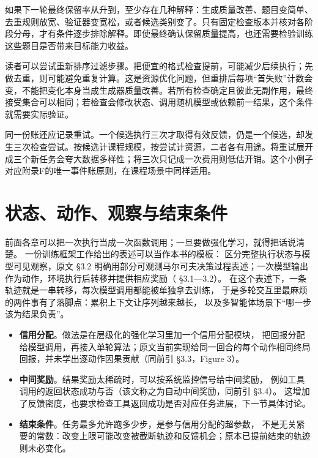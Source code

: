 如果下一轮最终保留率从升到，至少存在几种解释：生成质量改善、题目变简单、去重规则放宽、验证器变宽松，或者候选类别变了。只有固定检查版本并核对各阶段分母，才有条件逐步排除解释。即使最终确认保留质量提高，也还需要检验训练这些题目是否带来目标能力收益。

读者可以尝试重新排序过滤步骤。把便宜的格式检查提前，可能减少后续执行；先做去重，则可能避免重复计算。这是资源优化问题，但重排后每项“首失败”计数会变，不能把变化本身当成生成器质量改善。若所有检查确定且彼此无副作用，最终接受集合可以相同；若检查会修改状态、调用随机模型或依赖前一结果，这个条件就需要实际验证。

同一份账还应记录重试。一个候选执行三次才取得有效反馈，仍是一个候选，却发生三次检查尝试。按候选计课程规模，按尝试计资源，二者各有用途。将重试展开成三个新任务会夸大数据多样性；将三次只记成一次费用则低估开销。这个小例子对应附录F的唯一事件账原则，在课程场景中同样适用。

\section{状态、动作、观察与结束条件}
\label{sec:ch11-mdp}

\begin{sloppypar}
前面各章可以把一次执行当成一次函数调用；一旦要做强化学习，就得把话说清楚。
一份训练框架工作给出的表述可以当作本书的模板：
区分完整执行状态与模型可见观察，原文 §3.2 明确用部分可观测马尔可夫决策过程表述；一次模型输出作为动作，环境执行后转移并提供相应奖励（\cite{agent-lightning-2508} §3.1—3.2）。
在这个表述下，一条轨迹就是一串转移，每次模型调用都能被单独拿去训练，
于是多轮交互里最麻烦的两件事有了落脚点：累积上下文让序列越来越长，
以及多智能体场景下“哪一步该为结果负责”。
\end{sloppypar}

\begin{itemize}
\sloppy
  \item \textbf{信用分配}。做法是在层级化的强化学习里加一个信用分配模块，
        把回报分配给模型调用，再接入单轮算法；原文当前实现给同一回合的每个动作相同终局回报，并未学出逐动作因果贡献（同前引 §3.3，Figure 3）。
  \item \textbf{中间奖励}。结果奖励太稀疏时，可以按系统监控信号给中间奖励，
        例如工具调用的返回状态成功与否（该文称之为自动中间奖励，同前引 §3.4）。
        这增加了反馈密度，也要求检查工具返回成功是否对应任务进展，下一节具体讨论。
  \item \textbf{结束条件}。任务最多允许跑多少步，是参与信用分配的超参数，
        不是无关紧要的常数：改变上限可能改变被截断轨迹和反馈机会；原本已提前结束的轨迹则未必变化。
\end{itemize}

